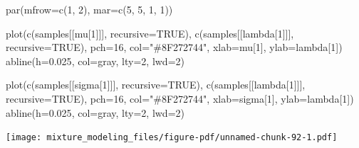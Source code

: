 \documentclass[
  letterpaper,
  DIV=11,
  numbers=noendperiod]{scrartcl}
\newenvironment{Shaded}{\begin{snugshade}}{\end{snugshade}}
\newcommand{\AttributeTok}[1]{\textcolor[rgb]{0.40,0.45,0.13}{#1}}
\newcommand{\ConstantTok}[1]{\textcolor[rgb]{0.56,0.35,0.01}{#1}}
\newcommand{\DecValTok}[1]{\textcolor[rgb]{0.68,0.00,0.00}{#1}}
\newcommand{\FloatTok}[1]{\textcolor[rgb]{0.68,0.00,0.00}{#1}}
\newcommand{\FunctionTok}[1]{\textcolor[rgb]{0.28,0.35,0.67}{#1}}
\newcommand{\NormalTok}[1]{\textcolor[rgb]{0.00,0.23,0.31}{#1}}
\newcommand{\StringTok}[1]{\textcolor[rgb]{0.13,0.47,0.30}{#1}}
\begin{document}
\begin{Shaded}
\begin{Highlighting}[]
\FunctionTok{par}\NormalTok{(}\AttributeTok{mfrow=}\FunctionTok{c}\NormalTok{(}\DecValTok{1}\NormalTok{, }\DecValTok{2}\NormalTok{), }\AttributeTok{mar=}\FunctionTok{c}\NormalTok{(}\DecValTok{5}\NormalTok{, }\DecValTok{5}\NormalTok{, }\DecValTok{1}\NormalTok{, }\DecValTok{1}\NormalTok{))}

\FunctionTok{plot}\NormalTok{(}\FunctionTok{c}\NormalTok{(samples[[}\StringTok{\textquotesingle{}mu[1]\textquotesingle{}}\NormalTok{]], }\AttributeTok{recursive=}\ConstantTok{TRUE}\NormalTok{),}
     \FunctionTok{c}\NormalTok{(samples[[}\StringTok{\textquotesingle{}lambda[1]\textquotesingle{}}\NormalTok{]], }\AttributeTok{recursive=}\ConstantTok{TRUE}\NormalTok{),}
     \AttributeTok{pch=}\DecValTok{16}\NormalTok{, }\AttributeTok{col=}\StringTok{"\#8F272744"}\NormalTok{,}
     \AttributeTok{xlab=}\StringTok{\textquotesingle{}mu[1]\textquotesingle{}}\NormalTok{, }\AttributeTok{ylab=}\StringTok{\textquotesingle{}lambda[1]\textquotesingle{}}\NormalTok{)}
\FunctionTok{abline}\NormalTok{(}\AttributeTok{h=}\FloatTok{0.025}\NormalTok{, }\AttributeTok{col=}\StringTok{\textquotesingle{}gray\textquotesingle{}}\NormalTok{, }\AttributeTok{lty=}\DecValTok{2}\NormalTok{, }\AttributeTok{lwd=}\DecValTok{2}\NormalTok{)}

\FunctionTok{plot}\NormalTok{(}\FunctionTok{c}\NormalTok{(samples[[}\StringTok{\textquotesingle{}sigma[1]\textquotesingle{}}\NormalTok{]], }\AttributeTok{recursive=}\ConstantTok{TRUE}\NormalTok{),}
     \FunctionTok{c}\NormalTok{(samples[[}\StringTok{\textquotesingle{}lambda[1]\textquotesingle{}}\NormalTok{]], }\AttributeTok{recursive=}\ConstantTok{TRUE}\NormalTok{),}
     \AttributeTok{pch=}\DecValTok{16}\NormalTok{, }\AttributeTok{col=}\StringTok{"\#8F272744"}\NormalTok{,}
     \AttributeTok{xlab=}\StringTok{\textquotesingle{}sigma[1]\textquotesingle{}}\NormalTok{, }\AttributeTok{ylab=}\StringTok{\textquotesingle{}lambda[1]\textquotesingle{}}\NormalTok{)}
\FunctionTok{abline}\NormalTok{(}\AttributeTok{h=}\FloatTok{0.025}\NormalTok{, }\AttributeTok{col=}\StringTok{\textquotesingle{}gray\textquotesingle{}}\NormalTok{, }\AttributeTok{lty=}\DecValTok{2}\NormalTok{, }\AttributeTok{lwd=}\DecValTok{2}\NormalTok{)}
\end{Highlighting}
\end{Shaded}

\texttt{[image: mixture\_modeling\_files/figure-pdf/unnamed-chunk-92-1.pdf]}
\end{document}
